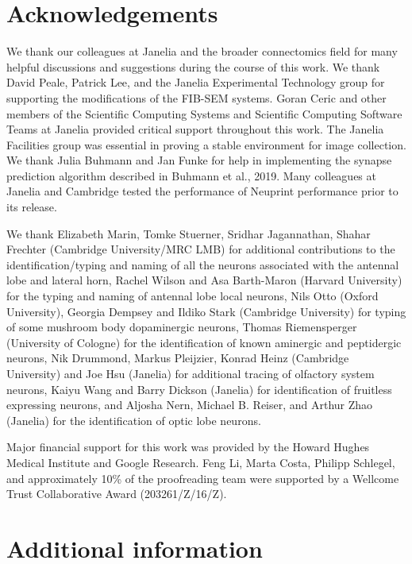 \documentclass{article}
\begin{document}
\section*{Acknowledgements}

We thank our colleagues at Janelia and the broader connectomics field for many helpful discussions and suggestions during the course of this work. We thank David Peale, Patrick Lee, and the Janelia Experimental Technology group for supporting the modifications of the FIB-SEM systems. Goran Ceric and other members of the Scientific Computing Systems and Scientific Computing Software Teams at Janelia provided critical support throughout this work. The Janelia Facilities group was essential in proving a stable environment for image collection. We thank Julia Buhmann and Jan Funke for help in implementing the synapse prediction algorithm described in Buhmann et al., 2019. Many colleagues at Janelia and Cambridge tested the performance of Neuprint performance prior to its release.

We thank Elizabeth Marin, Tomke Stuerner, Sridhar Jagannathan, Shahar Frechter (Cambridge University/MRC LMB) for additional contributions to the identification/typing and naming of all the neurons associated with the antennal lobe and lateral horn, Rachel Wilson and Asa Barth-Maron (Harvard University) for the typing and naming of antennal lobe local neurons, Nils Otto (Oxford University), Georgia Dempsey and Ildiko Stark (Cambridge University) for typing of some mushroom body dopaminergic neurons, Thomas Riemensperger (University of Cologne) for the identification of known aminergic and peptidergic neurons, Nik Drummond, Markus Pleijzier, Konrad Heinz (Cambridge University) and Joe Hsu (Janelia) for additional tracing of olfactory system neurons, Kaiyu Wang and Barry Dickson (Janelia) for identification of fruitless expressing neurons, and Aljosha Nern, Michael B. Reiser, and Arthur Zhao (Janelia) for the identification of optic lobe neurons.

Major financial support for this work was provided by the Howard Hughes Medical Institute and Google Research. Feng Li, Marta Costa, Philipp Schlegel, and approximately 10\% of the proofreading team were supported by a Wellcome Trust Collaborative Award (203261/Z/16/Z).

\section*{Additional information}
\end{document}
